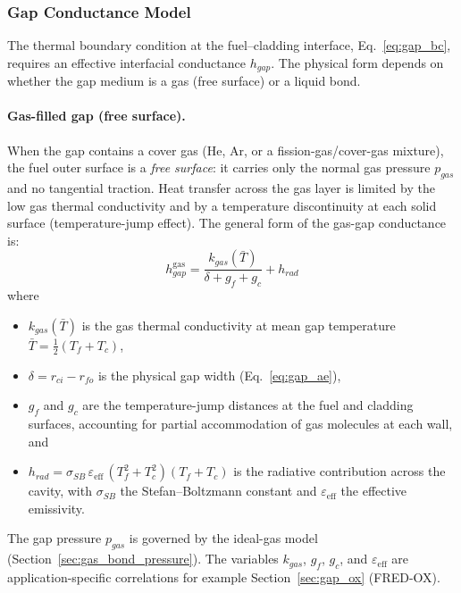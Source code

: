 \begin{refsection}
\subsubsection{Gap Conductance Model}
\label{sec:gap}

The thermal boundary condition at the fuel--cladding interface, Eq.~\eqref{eq:gap_bc}, requires an effective interfacial conductance $h_{gap}$. The physical form depends on whether the gap medium is a gas (free surface) or a liquid bond.

\paragraph{Gas-filled gap (free surface).} When the gap contains a cover gas (He, Ar, or a fission-gas/cover-gas mixture), the fuel outer surface is a \emph{free surface}: it carries only the normal gas pressure $p_{gas}$ and no tangential traction.  Heat transfer across the gas layer is limited by the low gas thermal conductivity and by a temperature discontinuity at each solid surface (temperature-jump effect).  The general form of the gas-gap conductance is:
\begin{equation}
  h_{gap}^{\mathrm{gas}} = \frac{k_{gas}(\bar{T})}{\delta + g_f + g_c} + h_{rad}
  \label{eq:hgap_gas}
\end{equation}
where
\begin{itemize}
\item $k_{gas}(\bar{T})$ is the gas thermal conductivity at mean gap temperature $\bar{T} = \tfrac{1}{2}(T_f + T_c)$,
\item $\delta = r_{ci} - r_{fo}$ is the physical gap width (Eq.~\eqref{eq:gap_ae}),
\item $g_f$ and $g_c$ are the temperature-jump distances at the fuel and cladding surfaces, accounting for partial accommodation of gas molecules at each wall, and
\item $h_{rad} = \sigma_{SB}\,\varepsilon_{\mathrm{eff}}\, (T_f^2 + T_c^2)(T_f + T_c)$ is the radiative contribution across the cavity, with $\sigma_{SB}$ the Stefan--Boltzmann constant and $\varepsilon_{\mathrm{eff}}$ the effective emissivity.
\end{itemize}
The gap pressure $p_{gas}$ is governed by the ideal-gas model (Section~\ref{sec:gas_bond_pressure}).  The variables $k_{gas}$, $g_f$, $g_c$, and $\varepsilon_{\mathrm{eff}}$ are application-specific correlations for example Section~\ref{sec:gap_ox} (FRED-OX).


\end{refsection}
